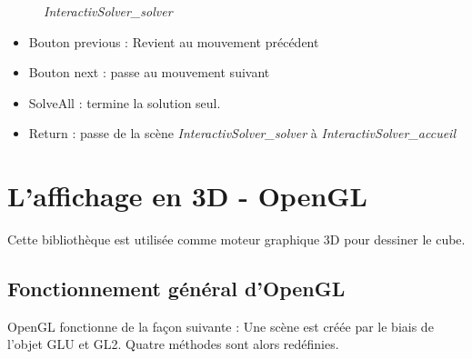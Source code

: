 \begin{figure}[h]
\begin{center}
\end{center}
	\caption{ \textit{InteractivSolver\_solver}}
\end{figure}

\begin{itemize}
    \item Bouton previous : Revient au mouvement précédent
    \item Bouton next : passe au mouvement suivant 
    \item SolveAll : termine la solution seul.
    \item Return : passe de la scène \textit{InteractivSolver\_solver} à \textit{InteractivSolver\_accueil}
\end{itemize}

\section{L'affichage en 3D - OpenGL}

Cette bibliothèque est utilisée comme moteur graphique 3D pour dessiner le cube.

\subsection{Fonctionnement général d'OpenGL}
OpenGL fonctionne de la façon suivante :
	Une scène est créée par le biais de l’objet GLU et GL2.
	Quatre méthodes sont alors redéfinies.

